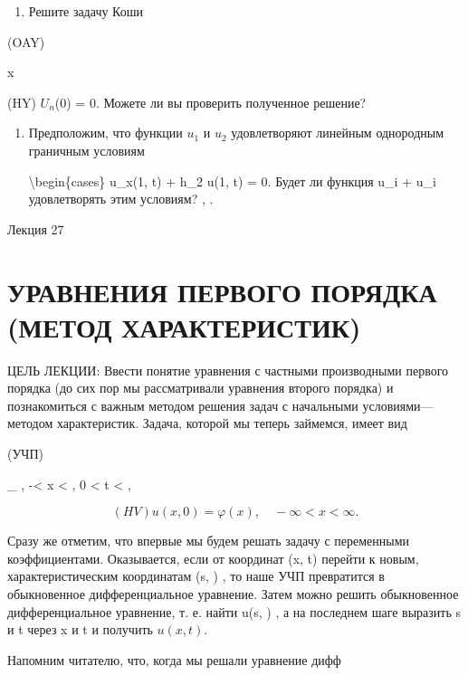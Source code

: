 \documentclass[
  ukrainian,
]{article}
\providecommand{\tightlist}{%
  \setlength{\itemsep}{0pt}\setlength{\parskip}{0pt}}
\begin{document}
\begin{enumerate}
\def\labelenumi{\arabic{enumi}.}
\setcounter{enumi}{4}
\tightlist
\item
  Решите задачу Коши
\end{enumerate}

(OAY)

x

(HY) \(U_n\)(0) = 0. Можете ли вы проверить полученное решение?

\begin{enumerate}
\def\labelenumi{\arabic{enumi}.}
\setcounter{enumi}{5}
\item
  Предположим, что функции \(u_1\) и \(u_2\) удовлетворяют линейным
  однородным граничным условиям

  \textbackslash begin\{cases\} u\_x(1, t) + h\_2 u(1, t) = 0. Будет ли
  функция u\_i + u\_i удовлетворять этим условиям? , .
\end{enumerate}

Лекция 27

\section{УРАВНЕНИЯ ПЕРВОГО ПОРЯДКА (МЕТОД
ХАРАКТЕРИСТИК)}\label{ux443ux440ux430ux432ux43dux435ux43dux438ux44f-ux43fux435ux440ux432ux43eux433ux43e-ux43fux43eux440ux44fux434ux43aux430-ux43cux435ux442ux43eux434-ux445ux430ux440ux430ux43aux442ux435ux440ux438ux441ux442ux438ux43a}

ЦЕЛЬ ЛЕКЦИИ: Ввести понятие уравнения с частными производными первого
порядка (до сих пор мы рассматривали уравнения второго порядка) и
познакомиться с важным методом решения задач с начальными
условиями---методом характеристик. Задача, которой мы теперь займемся,
имеет вид

(УЧП)

\_ \textbar, -\infty \textless{} x \textless{} \infty  , 0 \textless{} t
\textless{} \infty  ,

\[
(HV)   u(x, 0) = \varphi(x), \quad -\infty < x < \infty.
\]

Сразу же отметим, что впервые мы будем решать задачу с переменными
коэффициентами. Оказывается, если от координат (x, t) перейти к новым,
характеристическим координатам (s, \tau) , то наше УЧП превратится в
обыкновенное дифференциальное уравнение. Затем можно решить обыкновенное
дифференциальное уравнение, т. е. найти u(s, \tau) , а на последнем шаге
выразить s и t через x и t и получить \(u(x, t)\).

Напомним читателю, что, когда мы решали уравнение дифф
\end{document}
